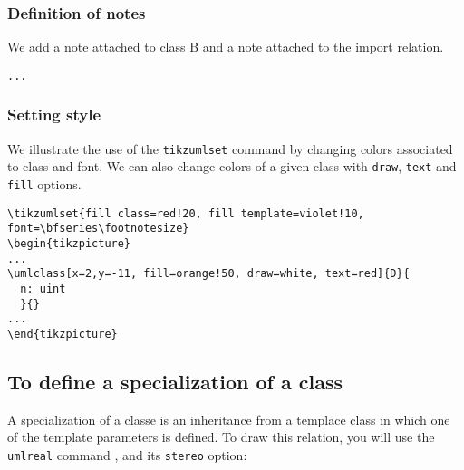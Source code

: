 \documentclass[a4paper,11pt]{report}
\begin{document}
\begin{center}
\end{center}

\subsubsection{Definition of notes}

We add a note attached to class B and a note attached to the import relation.

\medskip

\hspace{-0.7cm}\lstinline{...}
{\color{red!70!black}

}

\begin{center}
\end{center}

\subsubsection{Setting style}

We illustrate the use of the {\tt tikzumlset} command by changing colors associated to class and font. 
We can also change colors of a given class with {\tt draw}, {\tt text} and {\tt fill} options.

\medskip

\begin{lstlisting}
\tikzumlset{fill class=red!20, fill template=violet!10, font=\bfseries\footnotesize}
\begin{tikzpicture}
...
\umlclass[x=2,y=-11, fill=orange!50, draw=white, text=red]{D}{
  n: uint
  }{}
...
\end{tikzpicture}
\end{lstlisting}

\begin{center}
\end{center}

\subsection{To define a specialization of a class}

A specialization of a classe is an inheritance from a templace class in which one of the template parameters is defined. To draw this relation,  you will use the {\tt umlreal} command , and its {\tt stereo} option:
\end{document}
